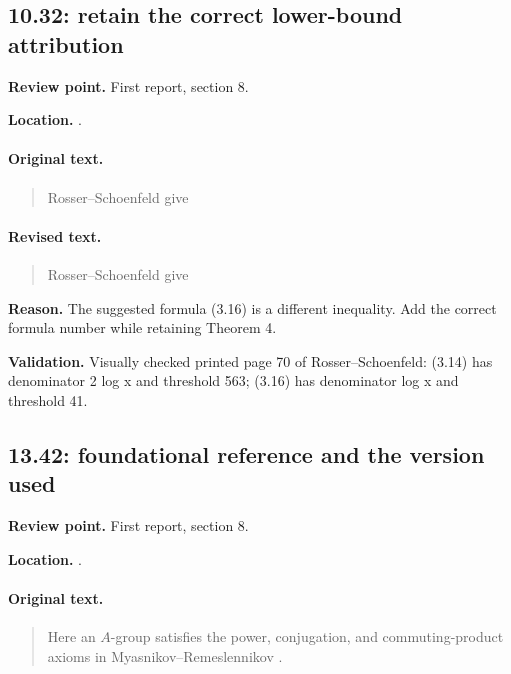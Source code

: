 \subsection{10.32: retain the correct lower-bound attribution}
\noindent\textbf{Review point.} First report, section 8.\par
\noindent\textbf{Location.} .

\paragraph{Original text.}
\begin{quote}\small
Rosser--Schoenfeld \cite[Theorems~4 and~9]{rosser-schoenfeld} give
\end{quote}

\paragraph{Revised text.}
\begin{quote}\small
Rosser--Schoenfeld \cite[Theorem~4, (3.14), and Theorem~9]{rosser-schoenfeld} give
\end{quote}

\noindent\textbf{Reason.} The suggested formula (3.16) is a different inequality. Add the correct formula number while retaining Theorem 4.

\noindent\textbf{Validation.} Visually checked printed page 70 of Rosser--Schoenfeld: (3.14) has denominator 2 log x and threshold 563; (3.16) has denominator log x and threshold 41.

\subsection{13.42: foundational reference and the version used}
\noindent\textbf{Review point.} First report, section 8.\par
\noindent\textbf{Location.} .

\paragraph{Original text.}
\begin{quote}\small
Here an \(A\)-group satisfies the power, conjugation, and
commuting-product axioms in Myasnikov--Remeslennikov
\cite[Definitions~1--2]{exponential-groups}.
\end{quote}

